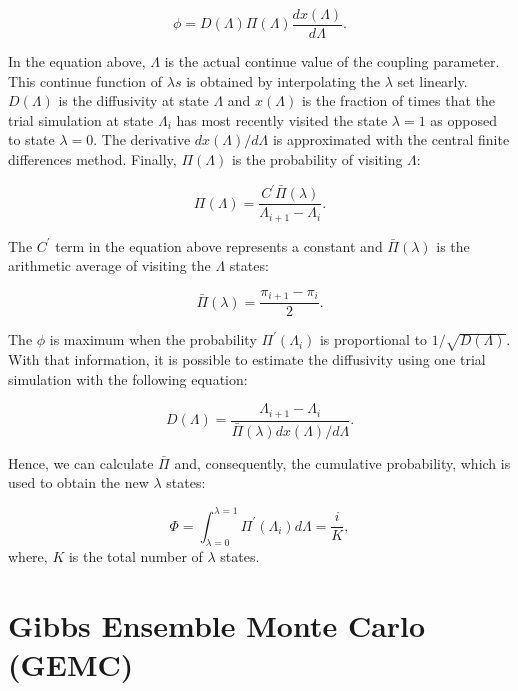 	\begin{equation}
	\phi = D(\Lambda) \Pi (\Lambda) \dfrac{dx(\Lambda)}{d \Lambda}.
	\label{eqn:stream}
	\end{equation}
	
	In the equation above, $\Lambda$ is the actual continue value of the coupling parameter. This continue function of $\lambda s$ is obtained by interpolating the $\lambda$ set linearly. $D(\Lambda)$ is the diffusivity at  state $\Lambda$ and $x(\Lambda)$ is the fraction of times that the trial simulation at state $\Lambda_{i}$ has most recently visited the state $\lambda=1$ as opposed to state $\lambda=0$. The derivative ${dx(\Lambda)}/{d \Lambda}$ is approximated with the central finite differences method. Finally, $\Pi (\Lambda)$ is the probability of visiting $\Lambda$:
	
	\begin{equation}
	\Pi (\Lambda) = \dfrac{C^{'} \bar{\Pi} (\lambda)}{\Lambda_{i+1} - \Lambda_{i}}.
	\label{eqn:plambda}
	\end{equation}
	
	The $C^{'} $ term in the equation above represents a constant and $\bar{\Pi} (\lambda)$ is the arithmetic average of visiting the $\Lambda$ states:
	
	\begin{equation}
	\bar{\Pi} (\lambda) = \dfrac{\pi_{i+1} - \pi_{i}}{2}.
	\label{eqn:barplambda}
	\end{equation}
	
	The $\phi$ is maximum when the probability $\Pi^{'}(\Lambda_{i})$ is proportional to $1/\sqrt{D(\Lambda)}$. With that information, it is possible to estimate the diffusivity using one trial simulation with the following equation:
	
	\begin{equation}
	D(\Lambda) = \dfrac{\Lambda_{i+1} - \Lambda_{i}}{\bar{\Pi} (\lambda) {dx(\Lambda)}/{d \Lambda}}.
	\label{eqn:diff}
	\end{equation}
	
	Hence, we can calculate $\bar{\Pi} $ and, consequently, the cumulative probability, which is used to obtain the new $\lambda$ states:
	
	\begin{equation}
	\Phi = \int_{\lambda =0}^{\lambda =1} \Pi^{'}(\Lambda_{i}) d \Lambda = \dfrac{i}{K},
	\label{eqn:cumfun}
	\end{equation}
	where, $K$ is the total number of $\lambda$ states. 
	
\section{Gibbs Ensemble Monte Carlo (GEMC)}\label{gemc}
	
